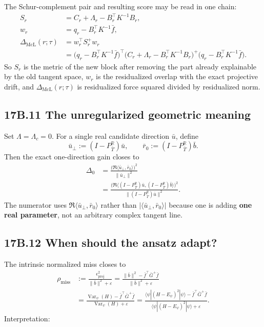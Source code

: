 \documentclass[11pt]{article}
\begin{document}
The Schur-complement pair and resulting score may be read in one chain:
\[
\begin{aligned}
S_r&=C_r+\Lambda_r-B_r^\top K^{-1}B_r,\\
w_r&=q_r-B_r^\top K^{-1}\bar f,\\
\Delta_{\mathrm{McL}}(r;\tau)&=w_r^\top S_r^+w_r\\
&=\bigl(q_r-B_r^\top K^{-1}\bar f\bigr)^\top\bigl(C_r+\Lambda_r-B_r^\top K^{-1}B_r\bigr)^+\bigl(q_r-B_r^\top K^{-1}\bar f\bigr).
\end{aligned}
\]
So $S_r$ is the metric of the new block after removing the part already explainable by the old tangent space, $w_r$ is the residualized overlap with the exact projective drift, and $\Delta_{\mathrm{McL}}(r;\tau)$ is residualized force squared divided by residualized norm.

\subsection*{17B.11 The unregularized geometric meaning}


Set $\Lambda=\Lambda_c=0$. For a single real candidate direction $\bar u$, define
\[
\bar u_\perp:=(I-P_{\bar T}^{\mathbb R})\bar u,
\qquad
\bar r_0:=(I-P_{\bar T}^{\mathbb R})\bar b.
\]
Then the exact one-direction gain closes to
\[
\begin{aligned}
\Delta_0
&=\frac{\bigl(\Re\langle \bar u_\perp,\bar r_0\rangle\bigr)^2}{\|\bar u_\perp\|^2}\\
&=\frac{\bigl(\Re\langle (I-P_{\bar T}^{\mathbb R})\bar u,(I-P_{\bar T}^{\mathbb R})\bar b\rangle\bigr)^2}{\|(I-P_{\bar T}^{\mathbb R})\bar u\|^2}.
\end{aligned}
\]
The numerator uses $\Re\langle \bar u_\perp,\bar r_0\rangle$ rather than $|\langle \bar u_\perp,\bar r_0\rangle|$ because one is adding \textbf{one real parameter}, not an arbitrary complex tangent line.

\subsection*{17B.12 When should the ansatz adapt?}


The intrinsic normalized miss closes to
\[
\begin{aligned}
\rho_{\mathrm{miss}}
&:=\frac{\epsilon_{\mathrm{proj}}^2}{\|\bar b\|^2+\varepsilon}
=\frac{\|\bar b\|^2-\bar f^\top\bar G^+\bar f}{\|\bar b\|^2+\varepsilon}\\
&=\frac{\operatorname{Var}_\psi(H)-\bar f^\top\bar G^+\bar f}{\operatorname{Var}_\psi(H)+\varepsilon}
=\frac{\langle \psi|(H-E_\psi)^2|\psi\rangle-\bar f^\top\bar G^+\bar f}{\langle \psi|(H-E_\psi)^2|\psi\rangle+\varepsilon}.
\end{aligned}
\]
Interpretation:
\end{document}
